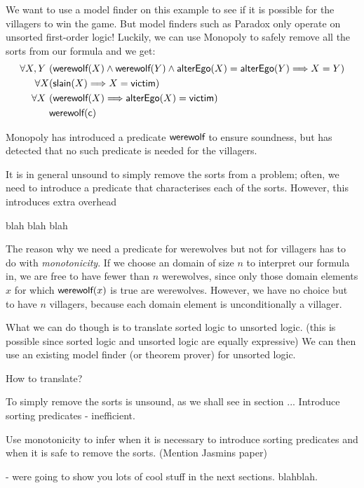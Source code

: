 We want to use a model finder on this example to see if it is possible
for the villagers to win the game. But model finders such as Paradox
only operate on unsorted first-order logic! Luckily, we can use
Monopoly to safely remove all the sorts from our formula and we get:
\begin{align*}
\forall X, Y \ & ( \mbox {\sf werewolf}(X) \land \mbox {\sf werewolf}(Y) \land \mbox {\sf alterEgo}(X) = \mbox {\sf alterEgo}(Y) \Longrightarrow X = Y) \\
\forall X & (\mbox {\sf slain}(X) \Longrightarrow X = \mbox{\sf victim}) \\
\forall X \ & (\mbox {\sf werewolf}(X) \Longrightarrow \mbox {\sf alterEgo}(X) = \mbox{\sf victim}) \\
& \mbox {\sf werewolf}(\mbox{\sf c})
\end{align*}

Monopoly has introduced a predicate $\mbox {\sf werewolf}$ to ensure soundness,
but has detected that no such predicate is needed for the villagers.

It is in general unsound to simply remove the sorts from a problem;
often, we need to introduce a predicate that characterises each of the
sorts. However, this introduces extra overhead 

blah blah blah

The reason why we need a predicate for werewolves but not for
villagers has to do with \emph{monotonicity}. If we choose an
domain of size $n$ to interpret our formula in, we are free to have
fewer than $n$ werewolves, since only those domain elements $x$
for which $\mbox {\sf werewolf}(x)$ is true are werewolves. However, we have no
choice but to have $n$ villagers, because each domain element is
unconditionally a villager. 

What we can do though is to translate sorted logic to unsorted logic. 
(this is possible since sorted logic and unsorted logic are equally expressive) 
We can then use an existing model finder (or theorem prover) for unsorted logic.

How to translate?

To simply remove the sorts is unsound, as we shall see in section ...
Introduce sorting predicates - inefficient.

Use monotonicity to infer when it is necessary to introduce sorting predicates
and when it is safe to remove the sorts. (Mention Jasmins paper)

- were going to show you lots of cool stuff in the next sections. blahblah.













